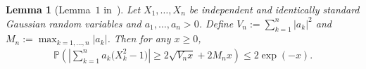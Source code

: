 \documentclass[10.5pt,letter]{article}
\numberwithin{equation}{section}
\newtheorem{lemma}[theorem]{Lemma}
\theoremstyle{definition}
\renewcommand{\P}{\mathbb{P}}
\newcommand{\1}{\mathbbm{1}}
\begin{document}
\begin{lemma}[Lemma~$1$ in~\cite{Massart}]\label{lemma:Bernstein_chi_squared}
Let $X_1,\dots, X_n$ be independent and identically standard Gaussian random variables and $a_1,\dots, a_n>0$. Define $V_n := \sum_{k=1}^n |a_k|^2$ and $M_n:=\max_{k=1,\dots,n}|a_k|$.
Then for any $x\geq 0$,
\begin{align*}
    \P\left( \left| \sum_{k=1}^n a_k \big(X_k^2-1\big)\right| \geq 2\sqrt{V_n x} + 2M_n x\right) \leq 2\exp\left( -x\right).
\end{align*}
\end{lemma}
\end{document}
